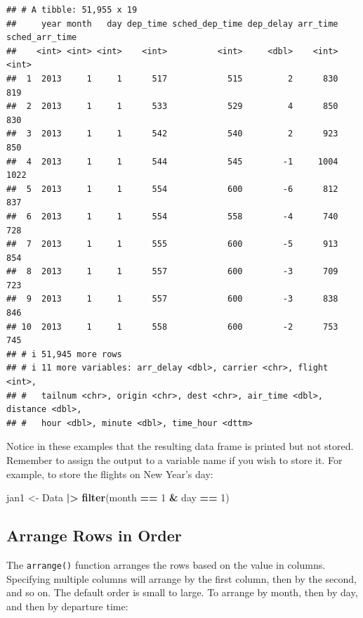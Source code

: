 \documentclass[
]{book}
\newenvironment{Shaded}{\begin{snugshade}}{\end{snugshade}}
\newcommand{\DecValTok}[1]{\textcolor[rgb]{0.00,0.00,0.81}{#1}}
\newcommand{\FunctionTok}[1]{\textcolor[rgb]{0.13,0.29,0.53}{\textbf{#1}}}
\newcommand{\NormalTok}[1]{#1}
\newcommand{\OtherTok}[1]{\textcolor[rgb]{0.56,0.35,0.01}{#1}}
\newcommand{\SpecialCharTok}[1]{\textcolor[rgb]{0.81,0.36,0.00}{\textbf{#1}}}
\theoremstyle{definition}
\theoremstyle{definition}
\theoremstyle{definition}
\theoremstyle{definition}
\theoremstyle{remark}
\begin{document}
\begin{verbatim}
## # A tibble: 51,955 x 19
##     year month   day dep_time sched_dep_time dep_delay arr_time sched_arr_time
##    <int> <int> <int>    <int>          <int>     <dbl>    <int>          <int>
##  1  2013     1     1      517            515         2      830            819
##  2  2013     1     1      533            529         4      850            830
##  3  2013     1     1      542            540         2      923            850
##  4  2013     1     1      544            545        -1     1004           1022
##  5  2013     1     1      554            600        -6      812            837
##  6  2013     1     1      554            558        -4      740            728
##  7  2013     1     1      555            600        -5      913            854
##  8  2013     1     1      557            600        -3      709            723
##  9  2013     1     1      557            600        -3      838            846
## 10  2013     1     1      558            600        -2      753            745
## # i 51,945 more rows
## # i 11 more variables: arr_delay <dbl>, carrier <chr>, flight <int>,
## #   tailnum <chr>, origin <chr>, dest <chr>, air_time <dbl>, distance <dbl>,
## #   hour <dbl>, minute <dbl>, time_hour <dttm>
\end{verbatim}

Notice in these examples that the resulting data frame is printed but not stored. Remember to assign the output to a variable name if you wish to store it. For example, to store the flights on New Year's day:

\begin{Shaded}
\begin{Highlighting}[]
\NormalTok{jan1 }\OtherTok{\textless{}{-}}\NormalTok{ Data }\SpecialCharTok{|\textgreater{}} 
  \FunctionTok{filter}\NormalTok{(month }\SpecialCharTok{==} \DecValTok{1} \SpecialCharTok{\&}\NormalTok{ day }\SpecialCharTok{==} \DecValTok{1}\NormalTok{)}
\end{Highlighting}
\end{Shaded}

\hypertarget{arrange-rows-in-order}{%
\subsection{Arrange Rows in Order}\label{arrange-rows-in-order}}

The \texttt{arrange()} function arranges the rows based on the value in columns. Specifying multiple columns will arrange by the first column, then by the second, and so on. The default order is small to large. To arrange by month, then by day, and then by departure time:
\end{document}
